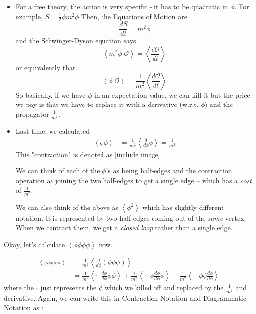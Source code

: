 \documentclass{article}
\newcommand{\cO}{\mathcal{O}}
\newcommand{\mean}[1]{\left\langle #1 \right\rangle}
\begin{document}
\begin{itemize}
  \item For a free theory, the action is very specific - it has to be quadratic in $\phi$. For example, $S = \frac{1}{2}\phi m^ 2\phi $ Then, the Equations of Motion are 
  \[ \frac{dS}{dt} = m^2 \phi \]
  and the Schwinger-Dyson equation says 
  \[ \mean{m^2 \phi \; \cO} = \mean{\frac{d \cO}{dt}} \] or equivalently that 
  \[ \mean{\phi \; \cO} = \frac{1}{m^2} \mean{\frac{d \cO}{dt}} \] 
  So basically, if we have $\phi$ in an expectation value, we can kill it but the price we pay is that we have to replace it with a derivative (w.r.t. $\phi$) and the propagator $\frac{1}{m^2}$.

  \item Last time, we calculated 
  \begin{align*}
    \mean{{\phi \phi}} &= \frac{1}{m^2} \mean{\frac{d}{d\phi} \phi} = \frac{1}{m^2}
  \end{align*}
  This "contraction" is denoted as 
  [include image]


  We can think of each of the $\phi$'s as being half-edges and the contraction operation as joining the two half-edges to get a single edge -- which has a \emph{cost} of $\frac{1}{m^2}$.

  \vskip 0.25cm 
  We can also think of the above as $\mean{\phi^2}$ which has slightly different notation. It is represented by two half-edges coming out of the \emph{same} vertex. When we contract them, we get a \emph{closed loop} rather than a single edge.
\end{itemize}

\vskip 0.5cm
Okay, let's calculate $\mean{\phi \phi \phi \phi}$ now.

\begin{align*}
  \mean{\phi \phi \phi \phi} &= \frac{1}{m^2} \mean{\frac{d}{d\phi}\left(\phi \phi \phi\right)} \\
  &= \frac{1}{m^2}\mean{\cdot\;\; \frac{d\phi}{d\phi} \phi \phi} + \frac{1}{m^2}\mean{\cdot\;\; \phi \frac{d\phi}{d\phi}  \phi} + \frac{1}{m^2}\mean{\cdot\;\; \phi \phi \frac{d\phi}{d\phi} }
\end{align*}
where the $\cdot$ just represents the $\phi$ which we killed off and replaced by the $\frac{1}{m^2}$ and derivative. Again, we can write this in Contraction Notation and Diagrammatic Notation as : 
\end{document}

